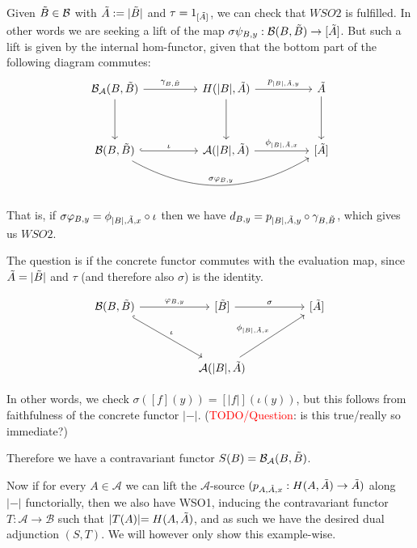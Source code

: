 \documentclass[12pt,a4paper]{article}
\def\HomA{\ensuremath\mathcal{A}}
\def\HomB{\ensuremath\mathcal{B}}
\def\t{\ensuremath\tilde}
\begin{document}
Given $\t B \in \mathcal{B}$ with $\t A := \lvert \t B \lvert $ and $\tau = 1_{[\t A]}$, we can check that $WSO2$ is fulfilled. In other words we are seeking a lift of the map $\sigma \psi_{B,y}: \HomB(B, \t B) \to [\t A]$. But such a lift is given by the internal hom-functor, given that the bottom part of the following diagram commutes:
\[\begin{tikzcd}
	{\HomB_\mathcal{A}(B, \t B)} && {H(\lvert B\lvert, \t A)} && {\t A} \\
	\\
	{\HomB(B, \t B)} && {\HomA(\lvert B \lvert , \t A) } && {[\t A]}
	\arrow["{\gamma_{B, \t B}}", from=1-1, to=1-3]
	\arrow[from=1-1, to=3-1]
	\arrow["{p_{\lvert B \lvert, \t A, y}}", from=1-3, to=1-5]
	\arrow[from=1-3, to=3-3]
	\arrow[from=1-5, to=3-5]
	\arrow["\iota", hook, from=3-1, to=3-3]
	\arrow["{\sigma \varphi_{B,y}}", bend right, from=3-1, to=3-5]
	\arrow["{\phi_{\lvert B\lvert , \t A,x }}", from=3-3, to=3-5]
\end{tikzcd}\]

That is, if $\sigma \varphi_{B,y} = \phi_{\lvert B\lvert, \t A, x} \circ \iota$ then we have $d_{B, y} = p_{\lvert B \lvert, \t A, y} \circ \gamma_{B, \t B}$, which gives us $WSO2$. 

The question is if the concrete functor commutes with the evaluation map, since $\t A = \lvert \t B \lvert $ and $\tau$ (and therefore also $\sigma$) is the identity.

\[\begin{tikzcd}
	{\HomB(B, \t B)} && {[\t B]} && {[\t A]} \\
	\\
	&& {\HomA(\lvert B \lvert , \t A) }
	\arrow["{\varphi_{B,y}}", from=1-1, to=1-3]
	\arrow["\iota", hook, from=1-1, to=3-3]
	\arrow["{\sigma }", from=1-3, to=1-5]
	\arrow["{\phi_{\lvert B\lvert , \t A,x }}", from=3-3, to=1-5]
\end{tikzcd}\]

In other words, we check $\sigma([f](y)) = [\lvert f \lvert ](\iota(y))$, but this follows from faithfulness of the concrete functor $\lvert - \lvert $. (\textcolor{red}{TODO/Question}: is this true/really so immediate?)

Therefore we have a contravariant functor $S(B) = \HomB_\mathcal{A}(B, \t B)$. 

Now if for every $A \in \mathcal{A}$ we can lift the $\mathcal{A}$-source $(p_{A, \t A, x}: H(A, \t A) \to \t A)$ along $\lvert - \lvert$ functorially, then we also have WSO1, inducing the contravariant functor $T: \mathcal{A} \to \mathcal{B}$ such that $\lvert T(A) \lvert = H(A, \t A)$, and as such we have the desired dual adjunction $(S, T)$. We will however only show this example-wise. 
\end{document}
